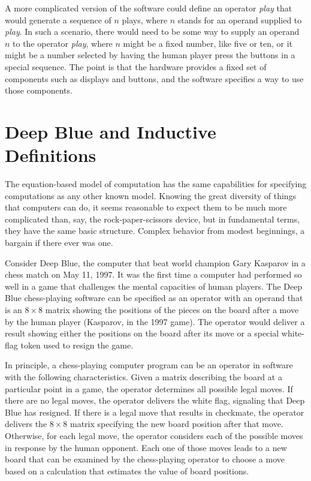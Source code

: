 A more complicated version of the software
could define an operator \textit{play} that would
generate a sequence of $n$ plays, where $n$ stands for
an operand supplied to \textit{play}.
In such a scenario, there would need to be some way to supply an operand $n$
to the operator \textit{play}, where $n$
might be a fixed number, like five or ten, or
it might be a number selected by having the human
player press the buttons in a special sequence.
The point is that the hardware provides a fixed set of
components such as displays and buttons,
and the software specifies a way to use those components.

\section{Deep Blue and Inductive Definitions}

The equation-based model of computation has the same
capabilities for specifying computations
as any other known model. Knowing the great diversity of things that computers can do,
it seems reasonable to expect them to be much more complicated than,
say, the rock-paper-scissors device, but in fundamental terms,
they have the same basic structure.
Complex behavior from modest beginnings, a bargain if there ever was one.

Consider Deep Blue, the
computer that beat world champion Gary Kasparov in a chess match on May 11,
1997. It was the first time a computer had performed so well in a
game that challenges the mental capacities of human players.
The Deep Blue chess-playing software can be specified as an operator 
with an operand that is an $8 \times 8$ matrix showing the positions of the pieces
on the board after a move by the human player (Kasparov, in the 1997 game).
The operator would deliver a result showing
either the positions on the board after its move or a special
white-flag token used to resign the game.

In principle, a chess-playing computer program can be an operator
in software with the following characteristics.
Given a matrix describing the board at a particular point in a game,
the operator determines all possible legal moves.  If there
are no legal moves, the operator delivers the white flag,
signaling that Deep Blue has resigned.
If there is a legal move that results
in checkmate, the operator delivers the $8 \times 8$ matrix specifying the
new board position after that move.  Otherwise, for each legal move,
the operator considers
each of the possible moves in response by the human opponent.
Each one of those moves leads to a new board that can be
examined by the chess-playing operator
to choose a move based on a calculation that estimates the value of
board positions.

